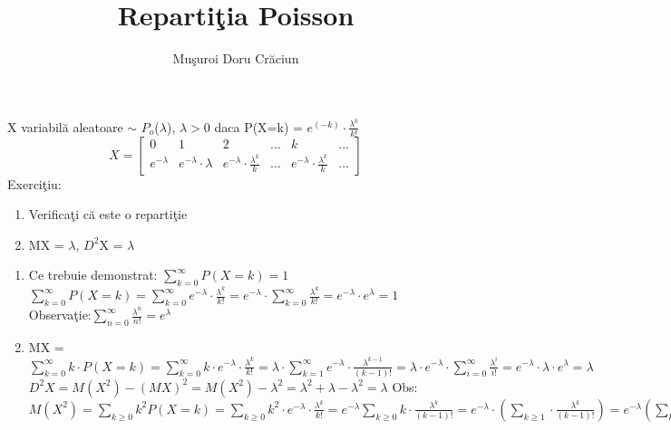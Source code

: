 \documentclass[a4paper,12pt]{article}
\title{Reparti\c{t}ia Poisson}
\author{Mu\c{s}uroi Doru Cr\u{a}ciun}
\begin{document}
	\maketitle
	X variabil\u{a} aleatoare $\sim$ $P_o$($\lambda$), $\lambda > 0$ daca P(X=k) = $e^{(-k)}\cdot \frac{\lambda^k}{k!}$
	\newline
	\[
	X=
	\begin{bmatrix}
	0 & 1 & 2 & ... & k & ... \\
	e^{-\lambda}
	& e^{-\lambda} \cdot \lambda
	& e^{-\lambda}\cdot \frac{\lambda^{k}}{k}
	&... & 
	e^{-\lambda}\cdot \frac{\lambda^{k}}{k} & ...
	\end{bmatrix}
	\]
	\newline
	Exerci\c{t}iu:
	\begin{enumerate}
		\item
		Verifica\c{t}i c\u{a} este o reparti\c{t}ie
		\item
		MX = $\lambda$, 
		$D^2$X = $\lambda$
	\end{enumerate}
	\begin{enumerate}
		\item
		Ce trebuie demonstrat:
		$\sum\limits_{k=0}^{\infty}P(X = k) = 1$
		\newline
		$\sum\limits_{k=0}^{\infty}P(X = k) = \sum\limits_{k=0}^{\infty}e^{-\lambda}\cdot \frac{\lambda^k}{k!} = e^{-\lambda}\cdot \sum\limits_{k=0}^{\infty}\frac{\lambda^k}{k!} = e^{-\lambda}\cdot e^{\lambda} = 1$
		\newline
		Observa\c{t}ie:$\sum\limits_{n=0}^{\infty}\frac{\lambda^n}{n!} = e^\lambda$
		\item
		MX = $\sum\limits_{k=0}^{\infty}k\cdot P(X = k) = \sum\limits_{k=0}^{\infty}k\cdot e^{-\lambda}\cdot \frac{\lambda^k}{k!} =
		\lambda\cdot\sum\limits_{k=1}^{\infty}e^{-\lambda}\cdot\frac{\lambda^{k-1}}{(k-1)!} = \lambda\cdot e^{-\lambda}\cdot\sum\limits_{i=0}^{\infty}\frac{\lambda^i}{i!} = e^{-\lambda}\cdot\lambda\cdot e^\lambda = \lambda$
		\newline
		$D^2X = M(X^2)-(MX)^2 = M(X^2) - \lambda^2 = \lambda^2 + \lambda - \lambda^2 = \lambda$
		\newline
		\newline
		Obs: $M(X^2) = \sum\limits_{k\geq0}k^2P(X=k) = \sum\limits_{k\geq0}k^2\cdot e^{-\lambda}\cdot\frac{\lambda^k}{k!} = e^{-\lambda}\sum\limits_{k\geq0}k\cdot\frac{\lambda^k}{(k-1)!} = e^{-\lambda}\cdot(\sum\limits_{k\geq1}\cdot\frac{\lambda^k}{(k-1)!}) = e^{-\lambda}(\sum\limits_{k\geq1}\frac{\lambda^k\cdot(k-1)}{(k-1)!} + \sum\limits_{k\geq1}\frac{\lambda^k}{(k-1)!}) = e^{-\lambda}(\lambda^2\cdot\sum\limits_{k\geq2}\frac{\lambda^{k-2}}{(k-2)!} + \lambda\cdot\sum\limits_{k\geq1}\frac{\lambda^{k-1}}{(k-1)!}) = e^{-\lambda}\cdot(\lambda^2\cdot e^\lambda + \lambda\cdot e^\lambda) = \lambda^2 + \lambda$
	\end{enumerate}
\end{document}
